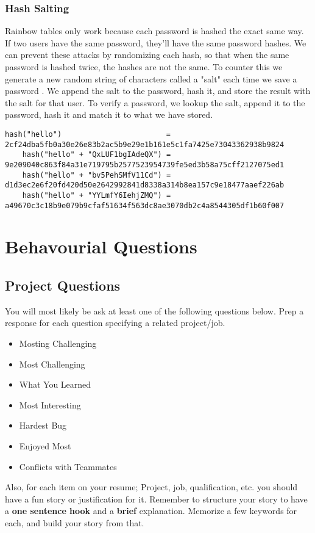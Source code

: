 \documentclass{article}
\begin{document}
		\subsubsection{Hash Salting}
		Rainbow tables only work because each password is hashed the exact same way. If two users have the same password, they'll have the same password hashes. We can prevent these attacks by randomizing each hash, so that when the same password is hashed twice, the hashes are not the same. To counter this we generate a new random string of characters called a "salt" each time we save a password . We append the salt to the password, hash it, and store the result with the salt for that user. To verify a password, we lookup the salt, append it to the password, hash it and match it to what we have stored.
		\begin{lstlisting}[style=pseudo, basicstyle={\footnotesize\ttfamily}]
	hash("hello")                        = 2cf24dba5fb0a30e26e83b2ac5b9e29e1b161e5c1fa7425e73043362938b9824
	hash("hello" + "QxLUF1bgIAdeQX") = 9e209040c863f84a31e719795b2577523954739fe5ed3b58a75cff2127075ed1
	hash("hello" + "bv5PehSMfV11Cd") = d1d3ec2e6f20fd420d50e2642992841d8338a314b8ea157c9e18477aaef226ab
	hash("hello" + "YYLmfY6IehjZMQ") = a49670c3c18b9e079b9cfaf51634f563dc8ae3070db2c4a8544305df1b60f007
		\end{lstlisting}




\clearpage
\section{Behavourial Questions}
	\subsection{Project Questions}
		You will most likely be ask at least one of the following questions below. Prep a response for each question specifying a related project/job.
		\begin{itemize}
			\item Mosting Challenging
			\item Most Challenging
			\item What You Learned
			\item Most Interesting
			\item Hardest Bug
			\item Enjoyed Most
			\item Conflicts with Teammates
		\end{itemize}
		Also, for each item on your resume; Project, job, qualification, etc. you should have a fun story or justification for it. Remember to structure your story to have a {\bf one sentence hook} and a {\bf brief} explanation. Memorize a few keywords for each, and build your story from that.
\end{document}
